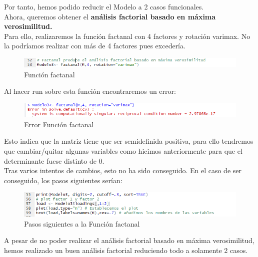 \documentclass[12pt,a4paper]{book}
\begin{document}
Por tanto, hemos podido reducir el Modelo a 2 casos funcionales. 
\\Ahora, queremos obtener el \textbf{análisis factorial basado en máxima verosimilitud. }
\\Para ello, realizaremos la función factanal con 4 factores y rotación varimax. No la podríamos realizar con más de 4 factores pues excedería. 
\begin{figure}[H]
\centering
\includegraphics[scale=0.75]{Captura22.png} 
\caption{Función factanal}
\label{fig:ff}
\end{figure}
Al hacer run sobre esta función encontraremos un error: 
\begin{figure}[H]
\centering
\includegraphics[scale=0.75]{Captura23.png} 
\caption{Error Función factanal}
\label{fig:errff}
\end{figure}
Esto indica que la matriz tiene que ser semidefinida positiva, para ello tendremos que cambiar/quitar algunas variables como hicimos anteriormente para que el determinante fuese distinto de 0. 
\\Tras varios intentos de cambios, esto no ha sido conseguido. En el caso de ser conseguido, los pasos siguientes serían: 
\begin{figure}[H]
\centering
\includegraphics[scale=0.75]{Captura24.png} 
\caption{Pasos siguientes a la Función factanal}
\label{fig:psff}
\end{figure}
A pesar de no poder realizar el análisis factorial basado en máxima verosimilitud, hemos realizado un buen análisis factorial reduciendo todo a solamente 2 casos. 
\end{document}
